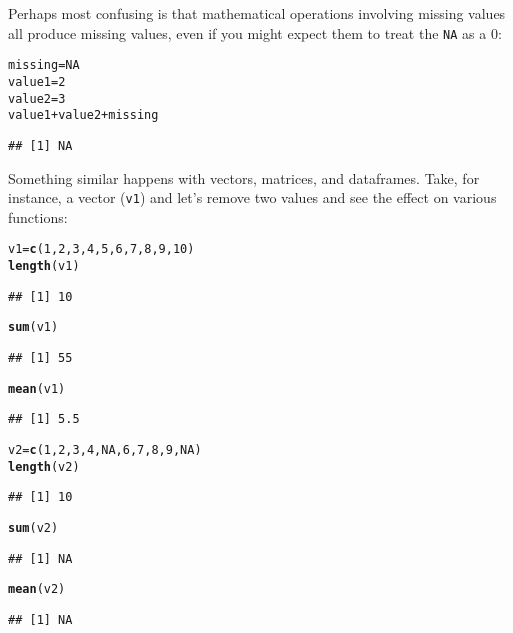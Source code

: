 \documentclass[12pt]{article}\usepackage[]{graphicx}\usepackage[]{color}
\makeatletter
\newcommand{\hlnum}[1]{\textcolor[rgb]{0.686,0.059,0.569}{#1}}%
\newcommand{\hlopt}[1]{\textcolor[rgb]{0,0,0}{#1}}%
\newcommand{\hlstd}[1]{\textcolor[rgb]{0.345,0.345,0.345}{#1}}%
\newcommand{\hlkwb}[1]{\textcolor[rgb]{0.69,0.353,0.396}{#1}}%
\newcommand{\hlkwd}[1]{\textcolor[rgb]{0.737,0.353,0.396}{\textbf{#1}}}%
\newenvironment{kframe}{%
 \def\at@end@of@kframe{}%
 \ifinner\ifhmode%
  \def\at@end@of@kframe{\end{minipage}}%
  \begin{minipage}{\columnwidth}%
 \fi\fi%
 \def\FrameCommand##1{\hskip\@totalleftmargin \hskip-\fboxsep
 \colorbox{shadecolor}{##1}\hskip-\fboxsep
     \hskip-\linewidth \hskip-\@totalleftmargin \hskip\columnwidth}%
 \MakeFramed {\advance\hsize-\width
   \@totalleftmargin\z@ \linewidth\hsize
   \@setminipage}}%
 {\par\unskip\endMakeFramed%
 \at@end@of@kframe}
\newenvironment{knitrout}{}{} %
\makeatother
\begin{document}
Perhaps most confusing is that mathematical operations involving missing values all produce missing values, even if you might expect them to treat the \verb|NA| as a 0:
\begin{knitrout}
\color{fgcolor}\begin{kframe}
\begin{alltt}
\hlstd{missing} \hlkwb{=} \hlnum{NA}
\hlstd{value1} \hlkwb{=} \hlnum{2}
\hlstd{value2} \hlkwb{=} \hlnum{3}
\hlstd{value1} \hlopt{+} \hlstd{value2} \hlopt{+} \hlstd{missing}
\end{alltt}
\begin{verbatim}
## [1] NA
\end{verbatim}
\end{kframe}
\end{knitrout}


Something similar happens with vectors, matrices, and dataframes. Take, for instance, a vector (\verb|v1|) and let's remove two values and see the effect on various functions:
\begin{knitrout}
\color{fgcolor}\begin{kframe}
\begin{alltt}
\hlstd{v1} \hlkwb{=} \hlkwd{c}\hlstd{(}\hlnum{1}\hlstd{,} \hlnum{2}\hlstd{,} \hlnum{3}\hlstd{,} \hlnum{4}\hlstd{,} \hlnum{5}\hlstd{,} \hlnum{6}\hlstd{,} \hlnum{7}\hlstd{,} \hlnum{8}\hlstd{,} \hlnum{9}\hlstd{,} \hlnum{10}\hlstd{)}
\hlkwd{length}\hlstd{(v1)}
\end{alltt}
\begin{verbatim}
## [1] 10
\end{verbatim}
\begin{alltt}
\hlkwd{sum}\hlstd{(v1)}
\end{alltt}
\begin{verbatim}
## [1] 55
\end{verbatim}
\begin{alltt}
\hlkwd{mean}\hlstd{(v1)}
\end{alltt}
\begin{verbatim}
## [1] 5.5
\end{verbatim}
\begin{alltt}
\hlstd{v2} \hlkwb{=} \hlkwd{c}\hlstd{(}\hlnum{1}\hlstd{,} \hlnum{2}\hlstd{,} \hlnum{3}\hlstd{,} \hlnum{4}\hlstd{,} \hlnum{NA}\hlstd{,} \hlnum{6}\hlstd{,} \hlnum{7}\hlstd{,} \hlnum{8}\hlstd{,} \hlnum{9}\hlstd{,} \hlnum{NA}\hlstd{)}
\hlkwd{length}\hlstd{(v2)}
\end{alltt}
\begin{verbatim}
## [1] 10
\end{verbatim}
\begin{alltt}
\hlkwd{sum}\hlstd{(v2)}
\end{alltt}
\begin{verbatim}
## [1] NA
\end{verbatim}
\begin{alltt}
\hlkwd{mean}\hlstd{(v2)}
\end{alltt}
\begin{verbatim}
## [1] NA
\end{verbatim}
\end{kframe}
\end{knitrout}
\end{document}
